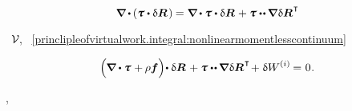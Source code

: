 \nopagebreak\vspace{-0.1em}\begin{equation*}
\boldnabla \hspace{-0.1ex} \dotp \hspace{-0.1ex} \left( \cauchystress \dotp \variation{\bm{R}} \hspace{.2ex} \right) \hspace{-0.1ex}
= \boldnabla \hspace{-0.1ex} \dotp \cauchystress \dotp \variation{\bm{R}} \hspace{.15ex}
+ \cauchystress \dotdotp \hspace{-0.12ex} \boldnabla \hspace{.1ex} \variation{\bm{R}}^{\hspace{.1ex}\T}
\end{equation*}

\vspace{-0.1em} \noindent {}~${\mathcal{V}\hspace{-0.2ex}}$,  ~\eqref{princlipleofvirtualwork.integral:nonlinearmomentlesscontinuum}

\nopagebreak\vspace{-0.2em}\begin{equation}\label{princlipleofvirtualwork.local:nonlinearmomentlesscontinuum}
\left(^{\mathstrut} \hspace{-0.2ex} \boldnabla \dotp \cauchystress \hspace{.1ex} + \hspace{-0.1ex} \rho \bm{f} \right) \hspace{-0.4ex} \dotp \variation{\bm{R}} \hspace{.2ex}
+ \cauchystress \dotdotp \hspace{-0.12ex} \boldnabla \hspace{.1ex} \variation{\bm{R}}^{\hspace{.1ex}\T} \hspace{-0.32ex}
+ \hspace{.1ex} \variation{\internalwork}
= \hspace{.1ex} 0 \hspace{.1ex}.
\end{equation}

\vspace{-0.25em}
   , 

